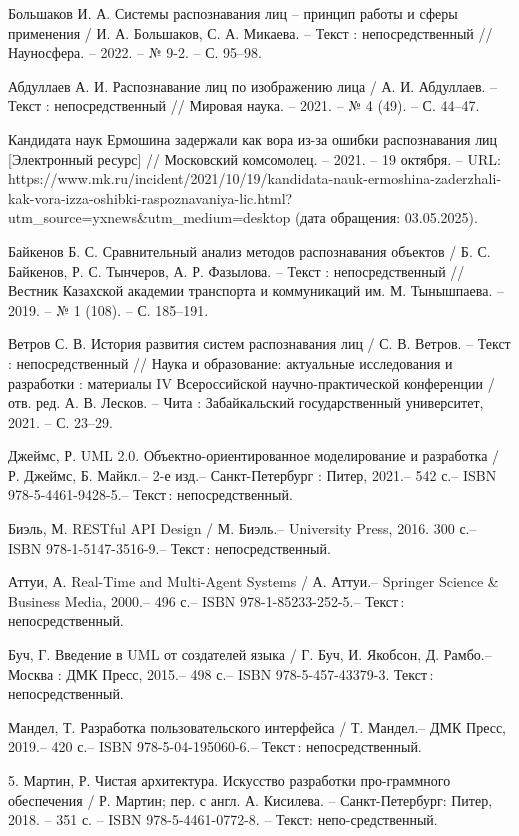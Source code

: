 
\begin{thebibliography}{9}

     Большаков И. А. Системы распознавания лиц – принцип работы и сферы применения / И. А. Большаков, С. А. Микаева. – Текст : непосредственный // Науносфера. – 2022. – № 9-2. – С. 95–98.
    
     Абдуллаев А. И. Распознавание лиц по изображению лица / А. И. Абдуллаев. – Текст : непосредственный // Мировая наука. – 2021. – № 4 (49). – С. 44–47.
    
     Кандидата наук Ермошина задержали как вора из-за ошибки распознавания лиц [Электронный ресурс] // Московский комсомолец. – 2021. – 19 октября. – URL: https://www.mk.ru/incident/2021/10/19/kandidata-nauk-ermoshina-zaderzhali-kak-vora-izza-oshibki-raspoznavaniya-lic.html? utm\_source=yxnews\&utm\_medium=desktop (дата обращения: 03.05.2025).
    
      Байкенов Б. С. Сравнительный анализ методов распознавания объектов / Б. С. Байкенов, Р. С. Тынчеров, А. Р. Фазылова. – Текст : непосредственный // Вестник Казахской академии транспорта и коммуникаций им. М. Тынышпаева. – 2019. – № 1 (108). – С. 185–191.
     
      Ветров С. В. История развития систем распознавания лиц / С. В. Ветров. – Текст : непосредственный // Наука и образование: актуальные исследования и разработки : материалы IV Всероссийской научно-практической конференции / отв. ред. А. В. Лесков. – Чита : Забайкальский государственный университет, 2021. – С. 23–29.
     
      Джеймс, Р. UML 2.0. Объектно-ориентированное моделирование и
     разработка / Р. Джеймс, Б. Майкл.– 2-е изд.– Санкт-Петербург : Питер, 2021.– 542 с.– ISBN 978-5-4461-9428-5.– Текст : непосредственный. 
     
      Биэль, М. RESTful API Design / М. Биэль.– University Press, 2016.
     300 с.– ISBN 978-1-5147-3516-9.– Текст : непосредственный.
     
      Аттуи, А. Real-Time and Multi-Agent Systems / А. Аттуи.– Springer
     Science \& Business Media, 2000.– 496 с.– ISBN 978-1-85233-252-5.– Текст :
     непосредственный.
     
     
      Буч, Г. Введение в UML от создателей языка / Г. Буч, И. Якобсон,
     Д. Рамбо.– Москва : ДМК Пресс, 2015.– 498 с.– ISBN 978-5-457-43379-3.
     Текст : непосредственный.
     
     
      Мандел, Т. Разработка пользовательского интерфейса / Т. Мандел.– ДМК Пресс, 2019.– 420 с.– ISBN 978-5-04-195060-6.– Текст : непосредственный.
     
      5.	Мартин, Р. Чистая архитектура. Искусство разработки про-граммного обеспечения / Р. Мартин; пер. с англ. А. Кисилева. – Санкт-Петербург: Питер, 2018. – 351 с. – ISBN 978-5-4461-0772-8. – Текст: непо-средственный.
     
    
\end{thebibliography}

